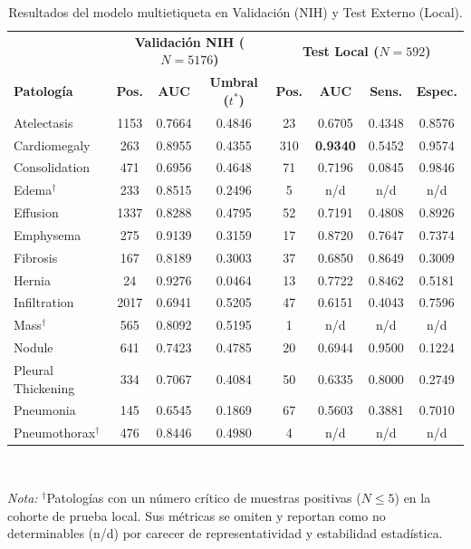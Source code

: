 \documentclass[../main.tex]{subfiles}
\begin{document}
\begin{table}[htbp]
    \centering
    \scriptsize
    \begin{tabular}{l | cc c | cc c c}
        \toprule
        & \multicolumn{3}{c|}{\textbf{Validación NIH ($N=5176$)}} & \multicolumn{4}{c}{\textbf{Test Local ($N=592$)}} \\
        \textbf{Patología} & \textbf{Pos.} & \textbf{AUC} & \textbf{Umbral ($t^*$)} & \textbf{Pos.} & \textbf{AUC} & \textbf{Sens.} & \textbf{Espec.} \\
        \midrule
        Atelectasis          & 1153 & 0.7664 & 0.4846 & 23  & 0.6705 & 0.4348 & 0.8576 \\
        Cardiomegaly         & 263  & 0.8955 & 0.4355 & 310 & \textbf{0.9340} & 0.5452 & 0.9574 \\
        Consolidation        & 471  & 0.6956 & 0.4648 & 71  & 0.7196 & 0.0845 & 0.9846 \\
        Edema$^{\dagger}$    & 233  & 0.8515 & 0.2496 & 5   & n/d    & n/d    & n/d    \\
        Effusion             & 1337 & 0.8288 & 0.4795 & 52  & 0.7191 & 0.4808 & 0.8926 \\
        Emphysema            & 275  & 0.9139 & 0.3159 & 17  & 0.8720 & 0.7647 & 0.7374 \\
        Fibrosis             & 167  & 0.8189 & 0.3003 & 37  & 0.6850 & 0.8649 & 0.3009 \\
        Hernia               & 24   & 0.9276 & 0.0464 & 13  & 0.7722 & 0.8462 & 0.5181 \\
        Infiltration         & 2017 & 0.6941 & 0.5205 & 47  & 0.6151 & 0.4043 & 0.7596 \\
        Mass$^{\dagger}$     & 565  & 0.8092 & 0.5195 & 1   & n/d    & n/d    & n/d    \\
        Nodule               & 641  & 0.7423 & 0.4785 & 20  & 0.6944 & 0.9500 & 0.1224 \\
        Pleural Thickening   & 334  & 0.7067 & 0.4084 & 50  & 0.6335 & 0.8000 & 0.2749 \\
        Pneumonia            & 145  & 0.6545 & 0.1869 & 67  & 0.5603 & 0.3881 & 0.7010 \\
        Pneumothorax$^{\dagger}$ & 476 & 0.8446 & 0.4980 & 4   & n/d    & n/d    & n/d    \\
        \bottomrule
    \end{tabular}
    \\[1ex]
    \caption{Resultados del modelo multietiqueta en Validación (NIH) y Test Externo (Local).}
    \label{tab:multilabel_results}
    \raggedright \textit{Nota:} $^{\dagger}$Patologías con un número crítico de muestras positivas ($N \le 5$) en la cohorte de prueba local. Sus métricas se omiten y reportan como no determinables (n/d) por carecer de representatividad y estabilidad estadística.
\end{table}
\end{document}
